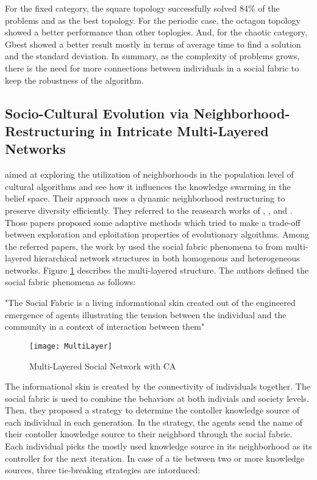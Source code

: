 For the fixed category, the square topology successfully solved 84\% of the problems and as the best topology. For the periodic case, the octagon topology showed a better performance than other toplogies. And, for the chaotic category, Gbest showed a better result mostly in terms of average time to find a solution and the standard deviation. In summary, as the complexity of problems grows, there is the need for more connections between individuals in a social fabric to keep the robustness of the algorithm.
\subsection{Socio-Cultural Evolution via Neighborhood-Restructuring in Intricate Multi-Layered Networks}
\citet{ali2012socio} aimed at exploring the utilization of neighborhoods in the population level of cultural algorithms and see how it influences the knowledge swarming in the belief space. Their approach uses a dynamic neighborhood restructuring to preserve diversity efficiently. They referred to the reasearch works of \citet{elsayed2011differential}, \citet{asafuddoula2011adaptive}, and \citet{asafuddoula2011adaptive}. Those papers proposed some adaptive methods which tried to make a trade-off between exploration and eploitation properties of evolutionary algoithms. Among the referred papers, the work by \citet{ali2010enhancing} used the social fabric phenomena to from multi-layered hierarchical network structures in both homogenous and heterogeneous networks. Figure \ref{fig:MLAYER} describes the multi-layered structure.\newline
The authors defined the social fabric phenomena as follows:
\begin{displayquote}
	"The Social Fabric is a living informational skin created out of the engineered emergence of agents illustrating the tension between the individual and the community in a context of interaction between them"
\end{displayquote}
\begin{figure}[h]
	\texttt{[image: MultiLayer]}
	\centering
	\caption{Multi-Layered Social Network with CA \citet{ali2012socio}}
	\label{fig:MLAYER}
\end{figure}
The informational skin is created by the connectivity of individuals together. The social fabric is used to combine the behaviors at both indivials and society levels. Then, they proposed a strategy to determine the contoller knowledge source of each individual in each generation. In the strategy, the agents send the name of their contoller knowledge source to their neighbord through the social fabric. Each individual picks the mostly used knowledge source in its neighborhood as its controller for the next iteration. In case of a tie between two or more knowledge sources, three tie-breaking strategies are intorduced:
